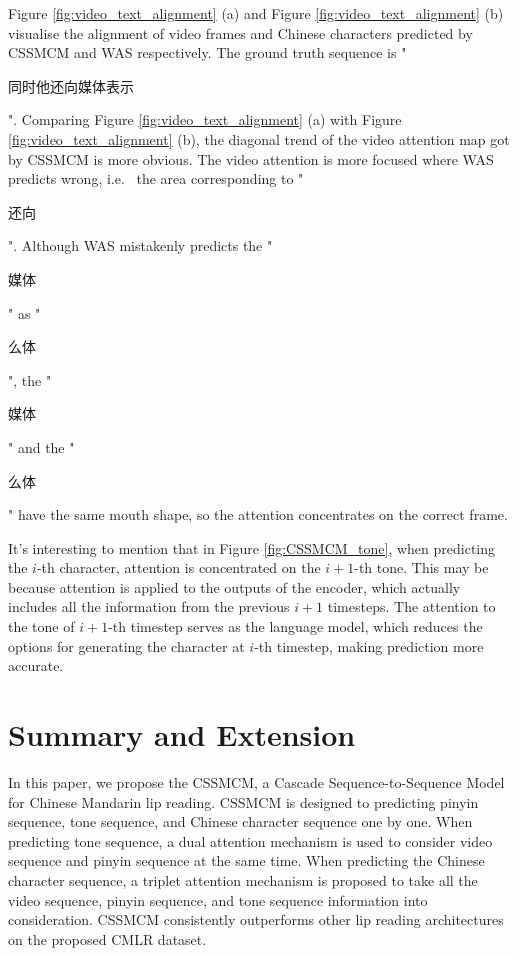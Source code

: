 \documentclass[sigconf]{acmart}
\begin{document}
Figure \ref{fig:video_text_alignment} (a) and Figure \ref{fig:video_text_alignment} (b) visualise the alignment of video frames and Chinese characters predicted by CSSMCM and WAS respectively. The ground truth sequence is "\begin{CJK*}{UTF8}{gbsn}同时他还向媒体表示\end{CJK*}". Comparing Figure \ref{fig:video_text_alignment} (a) with Figure \ref{fig:video_text_alignment} (b), the diagonal trend of the video attention map got by CSSMCM is more obvious. The video attention is more focused where WAS predicts wrong, i.e. \ the area corresponding to "\begin{CJK*}{UTF8}{gbsn}还向\end{CJK*}". Although WAS mistakenly predicts the "\begin{CJK*}{UTF8}{gbsn}媒体\end{CJK*}" as "\begin{CJK*}{UTF8}{gbsn}么体\end{CJK*}", the "\begin{CJK*}{UTF8}{gbsn}媒体\end{CJK*}" and the "\begin{CJK*}{UTF8}{gbsn}么体\end{CJK*}" have the same mouth shape, so the attention concentrates on the correct frame.

It's interesting to mention that in Figure \ref{fig:CSSMCM_tone}, when predicting the $i$-th character, attention is concentrated on the $i+1$-th tone. This may be because attention is applied to the outputs of the encoder, which actually includes all the information from the previous $i+1$ timesteps. The attention to the tone of $i+1$-th timestep serves as the language model, which reduces the options for generating the character at $i$-th timestep, making prediction more accurate.


\section{Summary and Extension}
In this paper, we propose the CSSMCM, a Cascade Sequence-to-Sequence Model for Chinese Mandarin lip reading. CSSMCM is designed to predicting pinyin sequence, tone sequence, and Chinese character sequence one by one. When predicting tone sequence, a dual attention mechanism is used to consider video sequence and pinyin sequence at the same time. When predicting the Chinese character sequence, a triplet attention mechanism is proposed to take all the video sequence, pinyin sequence, and tone sequence information into consideration. CSSMCM consistently outperforms other lip reading architectures on the proposed CMLR dataset. 
\end{document}
